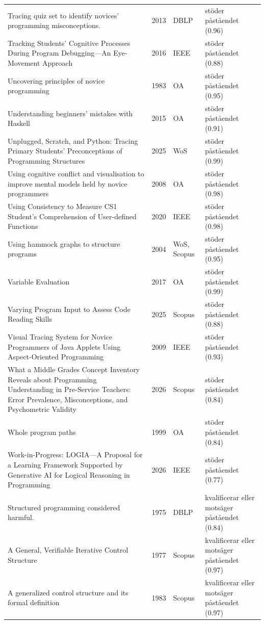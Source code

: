 \begin{longtable}{@{}%
  >{\raggedright\arraybackslash}p{}c%
  >{\raggedright\arraybackslash}p{}%
  >{\raggedright\arraybackslash}p{}@{}}
Tracing quiz set to identify novices' programming misconceptions. & 2013 & DBLP & stöder påståendet (0.96) \\
Tracking Students' Cognitive Processes During Program Debugging---An Eye-Movement Approach & 2016 & IEEE & stöder påståendet (0.88) \\
Uncovering principles of novice programming & 1983 & OA & stöder påståendet (0.95) \\
Understanding beginners' mistakes with Haskell & 2015 & OA & stöder påståendet (0.91) \\
Unplugged, Scratch, and Python: Tracing Primary Students' Preconceptions of Programming Structures & 2025 & WoS & stöder påståendet (0.99) \\
Using cognitive conflict and visualisation to improve mental models held by novice programmers & 2008 & OA & stöder påståendet (0.98) \\
Using Consistency to Measure CS1 Student's Comprehension of User-defined Functions & 2020 & IEEE & stöder påståendet (0.98) \\
Using hammock graphs to structure programs & 2004 & WoS, Scopus & stöder påståendet (0.95) \\
Variable Evaluation & 2017 & OA & stöder påståendet (0.99) \\
Varying Program Input to Assess Code Reading Skills & 2025 & Scopus & stöder påståendet (0.88) \\
Visual Tracing System for Novice Programmers of Java Applets Using Aspect-Oriented Programming & 2009 & IEEE & stöder påståendet (0.93) \\
What a Middle Grades Concept Inventory Reveals about Programming Understanding in Pre-Service Teachers: Error Prevalence, Misconceptions, and Psychometric Validity & 2026 & Scopus & stöder påståendet (0.84) \\
Whole program paths & 1999 & OA & stöder påståendet (0.84) \\
Work-in-Progress: LOGIA---A Proposal for a Learning Framework Supported by Generative AI for Logical Reasoning in Programming & 2026 & IEEE & stöder påståendet (0.77) \\
\textquotedbl{}Structured programming\textquotedbl{} considered harmful. & 1975 & DBLP & kvalificerar eller motsäger påståendet (0.84) \\
A General, Verifiable Iterative Control Structure & 1977 & Scopus & kvalificerar eller motsäger påståendet (0.97) \\
A generalized control structure and its formal definition & 1983 & Scopus & kvalificerar eller motsäger påståendet (0.97) \\

\end{longtable}

